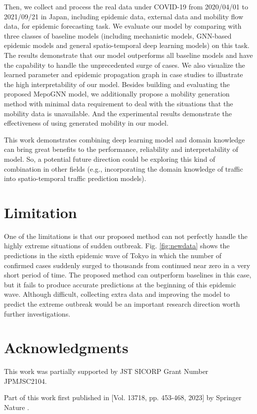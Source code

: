 \documentclass[lettersize,journal]{IEEEtran}
\begin{document}
Then, we collect and process the real data under COVID-19 from 2020/04/01 to 2021/09/21 in Japan, including epidemic data, external data and mobility flow data, for epidemic forecasting task. We evaluate our model by comparing with three classes of baseline models (including mechanistic models, GNN-based epidemic models and general spatio-temporal deep learning models) on this task. The results demonstrate that our model outperforms all baseline models and have the capability to handle the unprecedented surge of cases. We also visualize the learned parameter and epidemic propagation graph in case studies to illustrate the high interpretability of our model. Besides building and evaluating the proposed MepoGNN model, we additionally propose a mobility generation method with minimal data requirement to deal with the situations that the mobility data is unavailable. And the experimental results demonstrate the effectiveness of using generated mobility in our model. 

This work demonstrates combining deep learning model and domain knowledge can bring great benefits to the performance, reliability and interpretability of model. So, a potential future direction could be exploring this kind of combination in other fields (e.g., incorporating the domain knowledge of traffic into spatio-temporal traffic prediction models).

\section{Limitation}
One of the limitations is that our proposed method can not perfectly handle the highly extreme situations of sudden outbreak. Fig. \ref{fig:newdata} shows the predictions in the sixth epidemic wave of Tokyo in which the number of confirmed cases suddenly surged to thousands from continued near zero in a very short period of time. The proposed method can outperform baselines in this case, but it fails to produce accurate predictions at the beginning of this epidemic wave. Although difficult, collecting extra data and improving the model to predict the extreme outbreak would be an important research direction worth further investigations.

\section*{Acknowledgments}
This work was partially supported by JST SICORP Grant Number JPMJSC2104. 

Part of this work first published in [Vol. 13718, pp. 453-468, 2023] by Springer Nature \cite{cao2023mepognn}.





\vfill
\end{document}
